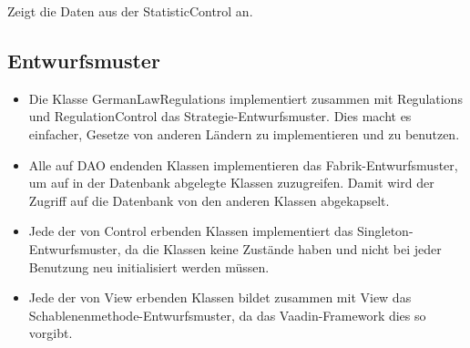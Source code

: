 \begin{itemize}
            \begin{itemize}
                    Zeigt die Daten aus der StatisticControl an.
            \end{itemize}

            \newline
            \begin{itemize}
            \end{itemize}

        \end{itemize}

    \subsection{Entwurfsmuster}
        \begin{itemize}
            \item Die Klasse GermanLawRegulations implementiert zusammen mit Regulations und RegulationControl das Strategie-Entwurfsmuster.
                Dies macht es einfacher, Gesetze von anderen Ländern zu implementieren und zu benutzen.
            \item Alle auf DAO endenden Klassen implementieren das Fabrik-Entwurfsmuster, um auf in der Datenbank abgelegte Klassen zuzugreifen.
                Damit wird der Zugriff auf die Datenbank von den anderen Klassen abgekapselt.
            \item Jede der von Control erbenden Klassen implementiert das Singleton-Entwurfsmuster, da die Klassen keine Zustände haben und nicht bei jeder Benutzung neu initialisiert werden müssen.
            \item Jede der von View erbenden Klassen bildet zusammen mit View das Schablenenmethode-Entwurfsmuster, da das Vaadin-Framework dies so vorgibt.
        \end{itemize}
